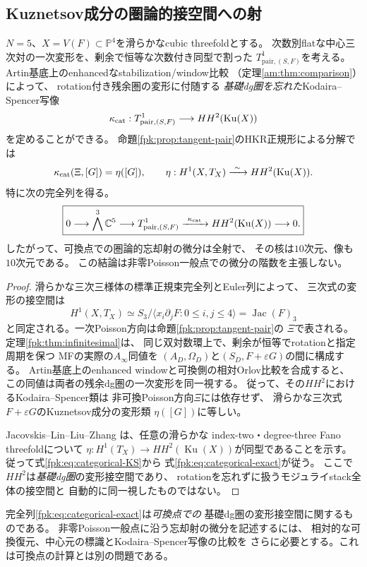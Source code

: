 \subsection{Kuznetsov成分の圏論的接空間への射}
\begin{theorem}[可換点での圏論的忘却射の微分]
\label{fpk:thm:categorical-tangent}
$N=5$、$X=V(F)\subset\mathbb P^4$を滑らかなcubic threefoldとする。
次数別flatな中心三次対の一次変形を、剰余で恒等な次数付き同型で割った
$T^1_{\mathrm{pair},(S,F)}$を考える。
Artin基底上のenhancedなstabilization/window比較
（定理\ref{am:thm:comparison}）によって、
rotation付き残余圏の変形に付随する
\emph{基礎dg圏を忘れた}Kodaira--Spencer写像
\[
 \kappa_{\rm cat}:T^1_{\mathrm{pair},(S,F)}
 \longrightarrow HH^2(\operatorname{Ku}(X))
\]
を定めることができる。
命題\ref{fpk:prop:tangent-pair}のHKR正規形による分解では
\begin{equation}\label{fpk:eq:categorical-KS}
 \kappa_{\rm cat}(\Xi,[G])=\eta([G]),
 \qquad
 \eta:H^1(X,T_X)\xrightarrow{\ \sim\ }HH^2(\operatorname{Ku}(X)).
\end{equation}
特に次の完全列を得る。
\begin{equation}\label{fpk:eq:categorical-exact}
 \boxed{
 0\longrightarrow\bigwedge^3\mathbb C^5
 \longrightarrow T^1_{\mathrm{pair},(S,F)}
 \xrightarrow{\ \kappa_{\rm cat}\ }
 HH^2(\operatorname{Ku}(X))
 \longrightarrow0 .
 }
\end{equation}
したがって、可換点での圏論的忘却射の微分は全射で、
その核は$10$次元、像も$10$次元である。
この結論は非零Poisson一般点での微分の階数を主張しない。
\end{theorem}
\begin{proof}
滑らかな三次三様体の標準正規束完全列とEuler列によって、
三次式の変形の接空間は
\[
 H^1(X,T_X)\simeq
 S_3/\langle x_i\partial_jF:0\le i,j\le4\rangle
 =\operatorname{Jac}(F)_3
\]
と同定される。一次Poisson方向は命題\ref{fpk:prop:tangent-pair}の
$\Xi$で表される。定理\ref{fpk:thm:infinitesimal}は、
同じ双対数環上で、剰余が恒等でrotationと指定周期を保つ
MFの実際の$A_\infty$同値を
$(A_D,\Omega_D)$と$(S_D,F+\varepsilon G)$の間に構成する。
Artin基底上のenhanced windowと可換側の相対Orlov比較を合成すると、
この同値は両者の残余dg圏の一次変形を同一視する。
従って、その$HH^2$におけるKodaira--Spencer類は
非可換Poisson方向$\Xi$には依存せず、
滑らかな三次式$F+\varepsilon G$のKuznetsov成分の変形類
$\eta([G])$に等しい。

Jacovskis--Lin--Liu--Zhang
\cite[Theorem~4.4(2)]{JLLZ}は、任意の滑らかな
index-two・degree-three Fano threefoldについて
$\eta:H^1(T_X)\to HH^2(\operatorname{Ku}(X))$が同型であることを示す。
従って式\eqref{fpk:eq:categorical-KS}から
式\eqref{fpk:eq:categorical-exact}が従う。
ここで$HH^2$は\emph{基礎dg圏}の変形接空間であり、
rotationを忘れずに扱うモジュライstack全体の接空間と
自動的に同一視したものではない。
\end{proof}
\begin{remark}[圏論的微分と相対復元]
\label{fpk:rem:categorical-scope}
完全列\eqref{fpk:eq:categorical-exact}は\emph{可換点での}
基礎dg圏の変形接空間に関するものである。
非零Poisson一般点に沿う忘却射の微分を記述するには、
相対的な可換復元、中心元の標識とKodaira--Spencer写像の比較を
さらに必要とする。これは可換点の計算とは別の問題である。
\end{remark}

